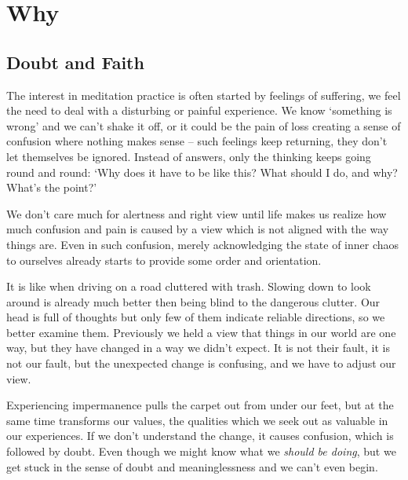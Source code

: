 \chapter{Why}

\section{Doubt and Faith}


The interest in meditation practice is often started by feelings of
suffering, we feel the need to deal with a disturbing or painful
experience. We know `something is wrong' and we can't shake it off, or
it could be the pain of loss creating a sense of confusion where nothing
makes sense -- such feelings keep returning, they don't let themselves
be ignored. Instead of answers, only the thinking keeps going round and
round: `Why does it have to be like this? What should I do, and why?
What's the point?'

We don't care much for alertness and right view until life makes us
realize how much confusion and pain is caused by a view which is not
aligned with the way things are. Even in such confusion, merely
acknowledging the state of inner chaos to ourselves already starts to
provide some order and orientation.

It is like when driving on a road cluttered with trash. Slowing down to
look around is already much better then being blind to the dangerous
clutter. Our head is full of thoughts but only few of them indicate
reliable directions, so we better examine them. Previously we held a
view that things in our world are one way, but they have changed in a
way we didn't expect. It is not their fault, it is not our fault, but
the unexpected change is confusing, and we have to adjust our view.

Experiencing impermanence pulls the carpet out from under our feet, but
at the same time transforms our values, the qualities which we seek out
as valuable in our experiences. If we don't understand the change, it
causes confusion, which is followed by doubt. Even though we might know
what we \emph{should be doing}, but we get stuck in the sense of doubt
and meaninglessness and we can't even begin.


